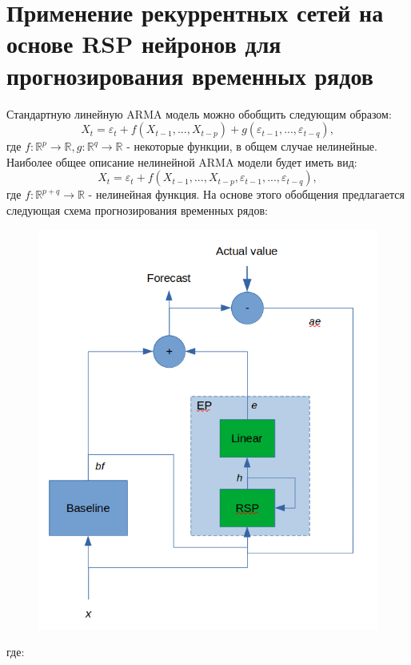 \documentclass[11pt]{article}
\begin{document}
\section*{Применение рекуррентных сетей на основе RSP нейронов для прогнозирования временных рядов}
Стандартную линейную ARMA модель можно обобщить следующим образом:
$$ X_t = \varepsilon_t + f(X_{t-1}, ..., X_{t-p}) + g(\varepsilon_{t-1},...,\varepsilon_{t-q}) ,$$
где $f: \mathbb{R}^p \to \mathbb{R}, g: \mathbb{R}^q \to \mathbb{R} $ - некоторые функции, в общем случае нелинейные. Наиболее общее описание нелинейной ARMA модели будет иметь вид:
$$ X_t = \varepsilon_t + f(X_{t-1}, ..., X_{t-p}, \varepsilon_{t-1}, ..., \varepsilon_{t-q}) ,$$
где $f: \mathbb{R}^{p+q} \to \mathbb{R}$ - нелинейная функция. На основе этого обобщения предлагается следующая схема прогнозирования временных рядов:
\begin{figure}[H]
\centering
\includegraphics[scale=0.3]{rsp_forecasting_scheme.png}
\label{}
\end{figure}
где:
\end{document}
